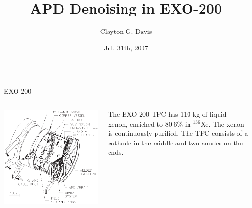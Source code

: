 \documentclass[final]{beamer} %
\title[U. of Maryland, College Park, MD]{APD Denoising in EXO-200}
\author[Clayton G. Davis]{Clayton G. Davis}
\institute[The EXO-200 Collaboration]{The EXO-200 Collaboration}
\date{Jul. 31th, 2007}
\begin{document}
  \begin{frame}{} 
  \begin{columns}[t]


  \begin{column}{.3\linewidth}

    \begin{block}{\large EXO-200}

      \begin{columns}
        \begin{column}{0.49\linewidth}
          \includegraphics[keepaspectratio=true,width=\textwidth]{TPCSchematic.eps}
        \end{column}
        \begin{column}{0.49\linewidth}
          The EXO-200 TPC has 110 kg of liquid xenon, enriched to 80.6\% in $^{136}$Xe.  The xenon is continuously purified.  The TPC consists of a cathode in the middle and two anodes on the ends.
        \end{column}
      \end{columns}


\end{block}
\end{column}
\end{columns}
\end{frame}
\end{document}

